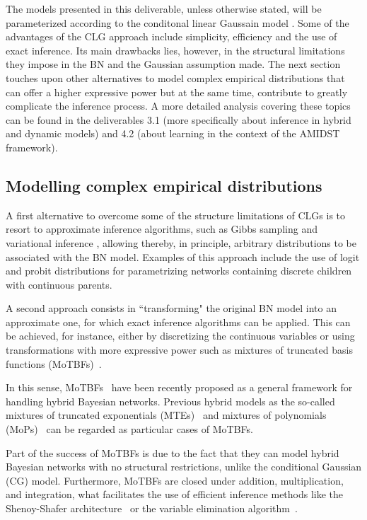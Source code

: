 The models presented in this deliverable, unless otherwise stated, will be parameterized according to the conditonal linear Gaussain model \cite{Lauritzen1992,LauritzenJensen2001}. Some of the advantages of the CLG approach include simplicity, efficiency and the use of exact inference. Its main drawbacks lies, however, in the structural limitations they impose in the BN and the Gaussian assumption made. The next section touches upon other alternatives to model complex empirical distributions that can offer a higher expressive power but at the same time, contribute to greatly complicate the inference process. A more detailed analysis covering these topics can be found in the deliverables 3.1 (more specifically about inference in hybrid and dynamic models) and 4.2 (about learning in the context of the AMIDST framework).
 

\subsection{Modelling complex empirical distributions}


A first alternative to overcome some of the structure limitations of CLGs is to resort to approximate inference algorithms, such as  Gibbs sampling \cite{Geman1984, hrycej1990gibbs} and variational inference \cite{Jordan1999}, allowing thereby, in principle, arbitrary distributions to be associated with the BN model. Examples of this approach include the use of logit and probit distributions for parametrizing networks containing discrete children with continuous parents.

A second approach consists in ``transforming" the original BN model into an approximate one, for which exact inference algorithms can be applied. This can be achieved, for instance, either by discretizing the continuous variables \cite{KozlovKollerUAI97} or using transformations with more expressive power such as mixtures of truncated basis functions (MoTBFs)~\cite{Langseth12}.

In this sense, MoTBFs~\cite{Langseth12} have been recently proposed as a general framework for handling hybrid Bayesian networks. Previous hybrid models as the so-called mixtures of truncated exponentials (MTEs)~\cite{Moral2001} and mixtures of polynomials (MoPs)~\cite{Shenoy2011} can be regarded as particular cases of MoTBFs. 

Part of the success of MoTBFs is due to the fact that they can model hybrid Bayesian networks with no structural restrictions, unlike the conditional Gaussian (CG) model. Furthermore, MoTBFs are closed under addition, multiplication, and integration, what facilitates the use of efficient inference methods like the Shenoy-Shafer architecture~\cite{She90} or the variable elimination algorithm~\cite{Zha96}. 

